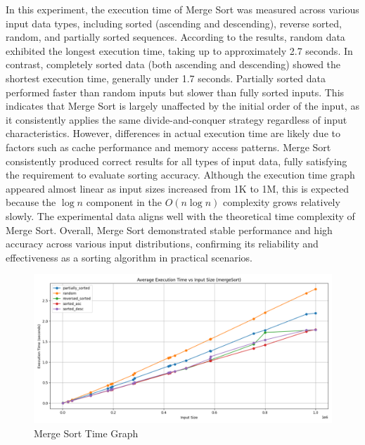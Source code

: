 \documentclass[sigconf]{acmart}
\begin{document}
In this experiment, the execution time of Merge Sort was measured across various input data types, including sorted (ascending and descending), reverse sorted, random, and partially sorted sequences. According to the results, random data exhibited the longest execution time, taking up to approximately 2.7 seconds. In contrast, completely sorted data (both ascending and descending) showed the shortest execution time, generally under 1.7 seconds. Partially sorted data performed faster than random inputs but slower than fully sorted inputs. This indicates that Merge Sort is largely unaffected by the initial order of the input, as it consistently applies the same divide-and-conquer strategy regardless of input characteristics. However, differences in actual execution time are likely due to factors such as cache performance and memory access patterns. Merge Sort consistently produced correct results for all types of input data, fully satisfying the requirement to evaluate sorting accuracy. Although the execution time graph appeared almost linear as input sizes increased from 1K to 1M, this is expected because the $\log n$ component in the $O(n\log n)$ complexity grows relatively slowly. The experimental data aligns well with the theoretical time complexity of Merge Sort. Overall, Merge Sort demonstrated stable performance and high accuracy across various input distributions, confirming its reliability and effectiveness as a sorting algorithm in practical scenarios.

\begin{figure}[H]
\centering
\includegraphics[width=0.85\linewidth]{figures/mergeTime.pdf}
\vspace{-0.3cm}
\caption{Merge Sort Time Graph}  
\vspace{-0.35cm}
\label{fig:proportion}
\end{figure}
\end{document}
